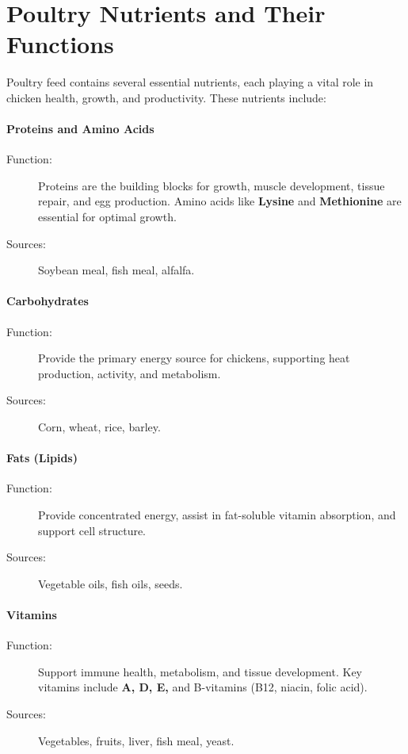 \documentclass[a4paper,12pt]{article}
\begin{document}
\newpage
\section{Poultry Nutrients and Their Functions}
Poultry feed contains several essential nutrients, each playing a vital role in chicken
health, growth, and productivity. These nutrients include:

\paragraph{Proteins and Amino Acids}
\begin{description}
	\item[Function:] Proteins are the building blocks for growth, muscle
development, tissue repair, and egg production. Amino acids like \textbf{Lysine}
and \textbf{Methionine} are essential for optimal growth.
	\item[Sources:] Soybean meal, fish meal, alfalfa.
\end{description}


\paragraph{Carbohydrates}
\begin{description}
	\item[Function:] Provide the primary energy source for chickens, supporting
heat production, activity, and metabolism.
	\item[Sources:] Corn, wheat, rice, barley.
\end{description}

\paragraph{Fats (Lipids)}
\begin{description}
	\item[Function:] Provide concentrated energy, assist in fat-soluble vitamin
absorption, and support cell structure.
	\item[Sources:] Vegetable oils, fish oils, seeds.
\end{description}

\paragraph{Vitamins}
\begin{description}
	\item[Function:] Support immune health, metabolism, and tissue development.
Key vitamins include \textbf{A, D, E,} and B-vitamins (B12, niacin, folic acid).
	\item[Sources:] Vegetables, fruits, liver, fish meal, yeast.
\end{description}
\end{document}
